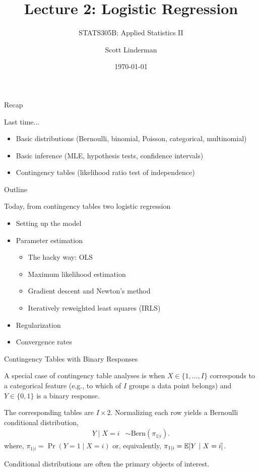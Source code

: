 \documentclass[aspectratio=169]{beamer}
\title{Lecture 2: Logistic Regression}
\subtitle{STATS305B: Applied  Statistics II}
\author{Scott Linderman}
\date{\today}
\begin{document}
\maketitle
    
\begin{frame}{Recap}

Last time...
\begin{itemize}
    \item Basic distributions (Bernoulli, binomial, Poisson, categorical, multinomial)
    \item Basic inference (MLE, hypothesis tests, confidence intervals)
    \item Contingency tables (likelihood ratio test of independence)
\end{itemize}

\end{frame}
    
\begin{frame}{Outline}

    Today, from contingency tables two logistic regression
    \begin{itemize}
        \item Setting up the model
        \item Parameter estimation
        \begin{itemize}
            \item The hacky way: OLS
            \item Maximum likelihood estimation
            \item Gradient descent and Newton's method
            \item Iteratively reweighted least squares (IRLS)
        \end{itemize}
        \item Regularization
        \item Convergence rates
    \end{itemize}
    
\end{frame}
    



\begin{frame}[t,allowframebreaks]{Contingency Tables with Binary
Responses}\label{contingency-tables-with-binary-responses}

A special case of contingency table analyses is when
\(X \in \{1, \ldots, I\}\) corresponds to a categorical feature (e.g.,
to which of \(I\) groups a data point belongs) and \(Y \in \{0,1\}\) is
a binary response.

The corresponding tables are \(I \times 2\). Normalizing each row yields
a Bernoulli conditional distribution, 
\begin{align*}
Y \mid X=i &\sim \mathrm{Bern}(\pi_{1|i}).
\end{align*} 
where, \(\pi_{1|i} = \Pr(Y=1 \mid X=i)\) or, equivalently,
\(\pi_{1|i} = \mathbb{E}[Y ~\vert~ X=i]\).

Conditional distributions are often the primary objects of interest.
\end{frame}
\end{document}
